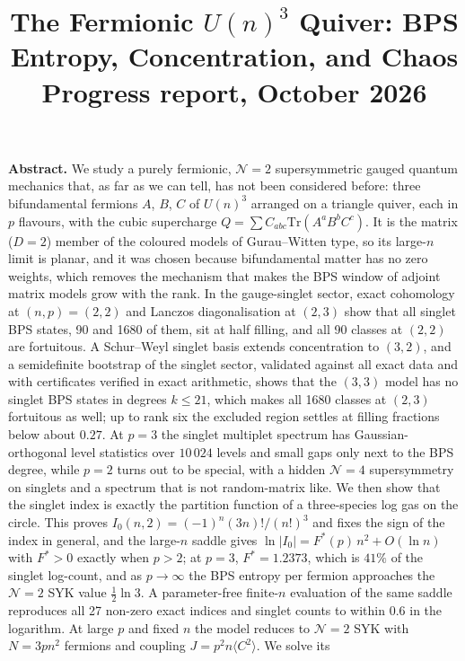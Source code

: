 \documentclass[10pt]{article}
\title{\vspace{-1.5cm}\Large\textbf{The Fermionic $U(n)^3$ Quiver: BPS Entropy, Concentration, and Chaos}\\[2pt]
\normalsize Progress report, October 2026\vspace{-6pt}}
\author{}
\date{}
\newcommand{\Tr}{\mathrm{Tr}}
\begin{document}
\maketitle
\vspace{-1.0cm}
\begin{center}\begin{minipage}{0.95\textwidth}\small
\textbf{Abstract.} We study a purely fermionic, $\mathcal N=2$ supersymmetric gauged quantum mechanics that, as far
as we can tell, has not been considered before: three bifundamental fermions $A$, $B$, $C$ of $U(n)^3$ arranged on
a triangle quiver, each in $p$ flavours, with the cubic supercharge $Q=\sum C_{abc}\Tr(A^aB^bC^c)$. It is the matrix
($D=2$) member of the coloured models of Gurau--Witten type, so its large-$n$ limit is planar, and it was chosen
because bifundamental matter has no zero weights, which removes the mechanism that makes the BPS window of adjoint
matrix models grow with the rank. In the gauge-singlet sector, exact cohomology at $(n,p)=(2,2)$ and Lanczos
diagonalisation at $(2,3)$ show that all singlet BPS states, 90 and 1680 of them, sit at half filling, and all 90
classes at $(2,2)$ are fortuitous. A Schur--Weyl singlet basis extends concentration to $(3,2)$, and a semidefinite
bootstrap of the singlet sector, validated against all exact data and with certificates verified in exact
arithmetic, shows that the $(3,3)$ model has no singlet BPS states in degrees $k\le21$, which makes all 1680 classes
at $(2,3)$ fortuitous as well; up to rank six the excluded region settles at filling fractions below about $0.27$. At $p=3$ the singlet
multiplet spectrum has
Gaussian-orthogonal level statistics over $10\,024$ levels and small gaps only next to the BPS degree, while $p=2$
turns out to be special, with a hidden $\mathcal N=4$ supersymmetry on singlets and a spectrum that is not
random-matrix like. We then show that the singlet index is exactly the partition function of a three-species log
gas on the circle. This proves $I_0(n,2)=(-1)^n(3n)!/(n!)^3$ and fixes the sign of the index in general, and the
large-$n$ saddle gives $\ln|I_0|=F^*(p)\,n^2+O(\ln n)$ with $F^*>0$ exactly when $p>2$; at $p=3$,
$F^*=1.2373$, which is $41\%$ of the singlet log-count, and as $p\to\infty$ the BPS entropy per fermion approaches
the $\mathcal N=2$ SYK value $\frac12\ln3$. A parameter-free finite-$n$ evaluation of the same saddle reproduces all
27 non-zero exact indices and singlet counts to within $0.6$ in the logarithm. At large $p$ and fixed $n$ the model
reduces to $\mathcal N=2$ SYK with $N=3pn^2$ fermions and coupling $J=p^2n\langle C^2\rangle$. We solve its

\end{minipage}
\end{center}
\end{document}
